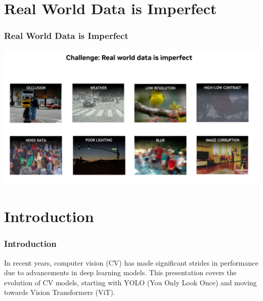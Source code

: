 \documentclass{beamer}
\begin{document}
\section{Real World Data is Imperfect}
\begin{frame}
\frametitle{\textbf{Real World Data is Imperfect}}
\centering
\begin{minipage}{1\textwidth}
    \centering
    \includegraphics[width=\textwidth]{images/noisy-real-world-data--1536x811.png} %
\end{minipage}
\end{frame}


\section{Introduction}
\begin{frame}
\frametitle{\textbf{Introduction}}
In recent years, computer vision (CV) has made significant strides in performance due to advancements in deep learning models. This presentation covers the evolution of CV models, starting with YOLO (You Only Look Once) and moving towards Vision Transformers (ViT).

\end{frame}

\end{document}
